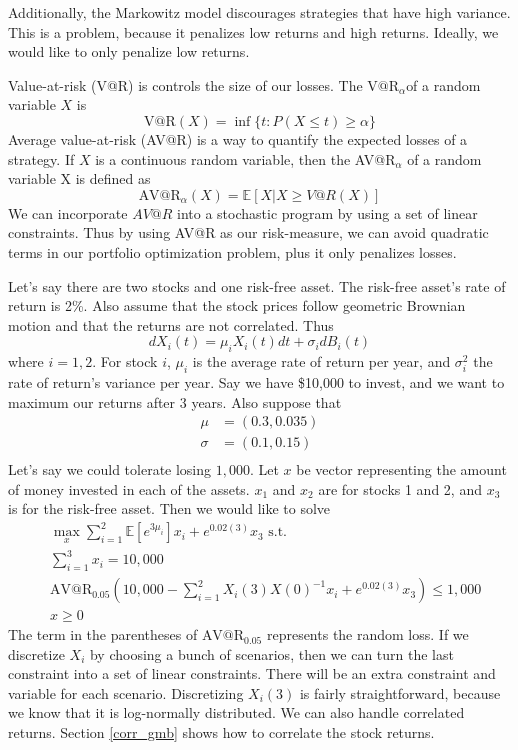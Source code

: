 \documentclass{amsart}
\theoremstyle{definition}
\theoremstyle{remark}
\begin{document}
Additionally, the Markowitz model discourages strategies that have high variance. This is a problem, because it penalizes low returns and high returns. Ideally, we would like to only penalize low returns.

Value-at-risk (V@R) is controls the size of our losses. The $\text{V@R}_\alpha$of a random variable $X$ is
\begin{equation*}
\text{V@R}(X) = \inf\{t : P(X \le t) \ge \alpha\}
\end{equation*}
Average value-at-risk (AV@R) is a way to quantify the expected losses of a strategy. If $X$ is a continuous random variable, then the AV@R$_\alpha$ of a random variable X is defined as
\begin{equation*}
\text{AV@R}_\alpha (X) = \mathbb{E}[X | X \ge V@R(X)]
\end{equation*}
We can incorporate $AV@R$ into a stochastic program by using a set of linear constraints. Thus by using AV@R as our risk-measure, we can avoid quadratic terms in our portfolio optimization problem, plus it only penalizes losses.

Let's say there are two stocks and one risk-free asset. The risk-free asset's rate of return is 2\%. Also assume that the stock prices follow geometric Brownian motion and that the returns are not correlated. Thus
\begin{equation*}
dX_i(t) = \mu_i X_i(t) dt + \sigma_i dB_i(t)
\end{equation*}
where $i=1,2$. For stock $i$, $\mu_i$ is the average rate of return per year, and $\sigma_i^2$ the rate of return's variance per year.
Say we have \$10,000 to invest, and we want to maximum our returns after 3 years. Also suppose that
\begin{align*}
\mu &= (0.3, 0.035)\\
\sigma &= (0.1, 0.15)\\
\end{align*}
Let's say we could tolerate losing $1,000$. Let $x$ be vector representing the amount of money invested in each of the assets. $x_1$ and $x_2$ are for stocks 1 and 2, and $x_3$ is for the risk-free asset. Then we would like to solve
\begin{align*}
&\max_x \sum_{i=1}^2\mathbb{E}[e^{3\mu_i}]x_i + e^{0.02(3)}x_3 \text{ s.t.}\\
&\sum_{i=1}^3 x_i = 10,000\\
&\text{AV@R}_{0.05}\left(10,000 - \sum_{i=1}^2 X_i(3) X(0)^{-1} x_i + e^{0.02(3)} x_3\right) \le 1,000\\
&x \ge 0
\end{align*}
The term in the parentheses of $\text{AV@R}_{0.05}$ represents the random loss. If we discretize $X_i$ by choosing a bunch of scenarios, then we can turn the last constraint into a set of linear constraints. There will be an extra constraint and variable for each scenario. Discretizing $X_i(3)$ is fairly straightforward, because we know that it is log-normally distributed. We can also handle correlated returns. Section \ref{corr_gmb} shows how to correlate the stock returns. 
\end{document}
